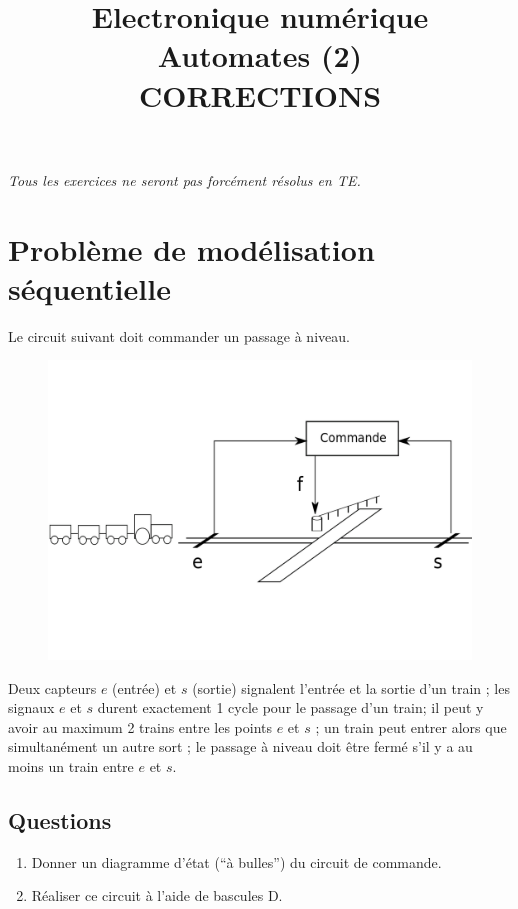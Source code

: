 \documentclass[a4paper,11pt]{article}
\title{{\Huge Electronique numérique}\\Automates (2)\\CORRECTIONS}
\date{}
\begin{document}
\maketitle
{\it Tous les exercices ne seront pas forcément résolus en TE.}

\section{Problème de modélisation séquentielle}
Le circuit suivant doit commander un passage à niveau.

\begin{figure}[!h]
\begin{center}
\includegraphics[scale=0.3]{./train.png}
\end{center}
\end{figure}

Deux capteurs $e$ (entrée) et $s$ (sortie) signalent l'entrée et la sortie d'un train ; les signaux $e$ et $s$ durent exactement 1 cycle pour le passage d'un train; il peut y avoir au maximum 2 trains entre les points $e$ et $s$ ; un train peut entrer alors que simultanément un autre sort ; le passage à niveau doit être fermé s'il y a au moins un train entre $e$ et $s$.

\subsection*{Questions}

\begin{enumerate}
\item Donner un diagramme d'état (``à bulles'') du circuit de commande.
\item Réaliser ce circuit à l'aide de bascules D.
\end{enumerate}
\end{document}

